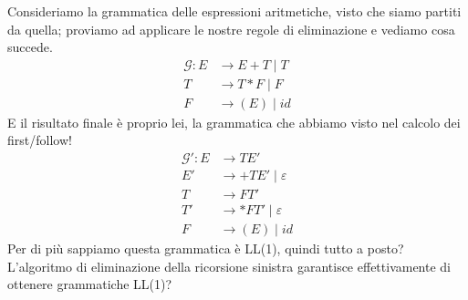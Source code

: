 \documentclass[class=book, crop=false, oneside, 12pt]{standalone}
\begin{document}
Consideriamo la grammatica delle espressioni aritmetiche, visto che siamo partiti da quella; proviamo ad applicare le nostre regole di eliminazione e vediamo cosa succede.
\begin{align*}
    \label{non-ll1_grammar}
    \mathcal{G}: E &\to E+T \mid T \\
    T &\to T*F \mid F \nonumber \\
    F &\to (E) \mid id \nonumber 
\end{align*}
E il risultato finale è proprio lei, la grammatica che abbiamo visto nel calcolo dei first/follow!
\begin{align*}
    \mathcal{G'}: E &\rightarrow TE' \\
    E' &\rightarrow +TE' \mid \varepsilon \\
    T &\rightarrow FT' \\
    T' &\rightarrow *FT' \mid \varepsilon \\
    F &\rightarrow (E) \mid id
\end{align*}
Per di più sappiamo questa grammatica è LL(1), quindi tutto a posto? L'algoritmo di eliminazione della ricorsione sinistra garantisce effettivamente di ottenere grammatiche LL(1)?
\end{document}
